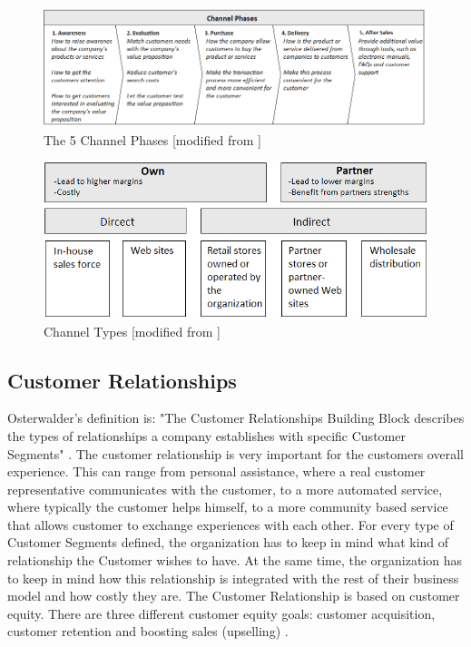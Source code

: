 \begin{figure}
\begin{center}
\includegraphics[angle=90,scale=0.6]{kjopskjede}
\caption[Channel Phases]{The 5 Channel Phases [modified from \cite{osterwalder}\cite{osterwalderthesis}]}
\label{fig:ChannelPhases}
\end{center}
\end{figure} 

\begin{figure}
\begin{center}
\includegraphics[scale=0.7]{channeltypes}
\caption[Channel Types]{Channel Types [modified from \cite{osterwalder}]}
\label{fig:ChannelTypes}
\end{center}
\end{figure} 

\newpage
\subsection{Customer Relationships}
Osterwalder's definition is: "The Customer Relationships Building Block describes the types of relationships a company establishes with specific Customer Segments" \cite{osterwalder}. The customer relationship is very important for the customers overall experience. This can range from personal assistance, where a real customer representative communicates with the customer, to a more automated service, where typically the customer helps himself,  to a more community based service that allows customer to exchange experiences with each other. For every type of Customer Segments defined, the organization has to keep in mind what kind of relationship the Customer wishes to have. At the same time, the organization has to keep in mind how this relationship is integrated with the rest of their business model and how costly they are. The Customer Relationship is based on customer equity. There are three different customer equity goals: customer acquisition, customer retention and boosting sales (upselling) \cite{osterwalderthesis}.

